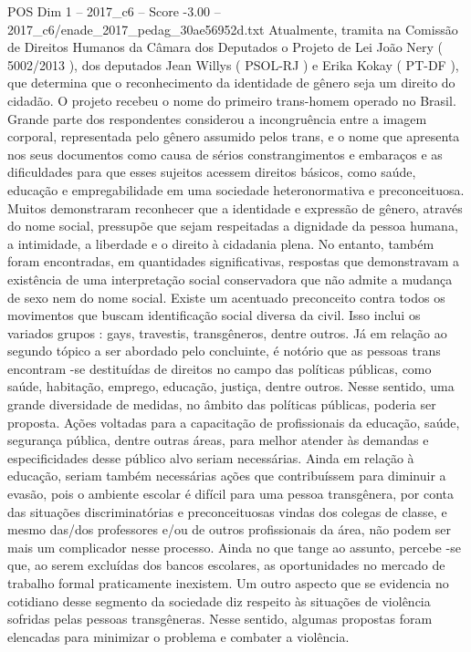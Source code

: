 \begin{textsample}{POS Dim 1 – 2017\_c6 – Score -3.00 – 2017\_c6/enade\_2017\_pedag\_30ae56952d.txt}
Atualmente, tramita na Comissão de Direitos Humanos da Câmara dos Deputados o Projeto de Lei João Nery ( 5002/2013 ), dos deputados Jean Willys ( PSOL-RJ ) e Erika Kokay ( PT-DF ), que determina que o reconhecimento da identidade de gênero seja um direito do cidadão.
O projeto recebeu o nome do primeiro trans-homem operado no Brasil.
Grande parte dos respondentes considerou a incongruência entre a imagem corporal, representada pelo gênero assumido pelos trans, e o nome que apresenta nos seus documentos como causa de sérios constrangimentos e embaraços e as dificuldades para que esses sujeitos acessem direitos básicos, como saúde, educação e empregabilidade em uma sociedade heteronormativa e preconceituosa.
Muitos demonstraram reconhecer que a identidade e expressão de gênero, através do nome social, pressupõe que sejam respeitadas a dignidade da pessoa humana, a intimidade, a liberdade e o direito à cidadania plena.
No entanto, também foram encontradas, em quantidades significativas, respostas que demonstravam a existência de uma interpretação social conservadora que não admite a mudança de sexo nem do nome social.
Existe um acentuado preconceito contra todos os movimentos que buscam identificação social diversa da civil.
Isso inclui os variados grupos : gays, travestis, transgêneros, dentre outros.
Já em relação ao segundo tópico a ser abordado pelo concluinte, é notório que as pessoas trans encontram -se destituídas de direitos no campo das políticas públicas, como saúde, habitação, emprego, educação, justiça, dentre outros.
Nesse sentido, uma grande diversidade de medidas, no âmbito das políticas públicas, poderia ser proposta.
Ações voltadas para a capacitação de profissionais da educação, saúde, segurança pública, dentre outras áreas, para melhor atender às demandas e especificidades desse público alvo seriam necessárias.
Ainda em relação à educação, seriam também necessárias ações que contribuíssem para diminuir a evasão, pois o ambiente escolar é difícil para uma pessoa transgênera, por conta das situações discriminatórias e preconceituosas vindas dos colegas de classe, e mesmo das/dos professores e/ou de outros profissionais da área, não podem ser mais um complicador nesse processo.
Ainda no que tange ao assunto, percebe -se que, ao serem excluídas dos bancos escolares, as oportunidades no mercado de trabalho formal praticamente inexistem.
Um outro aspecto que se evidencia no cotidiano desse segmento da sociedade diz respeito às situações de violência sofridas pelas pessoas transgêneras.
Nesse sentido, algumas propostas foram elencadas para minimizar o problema e combater a violência.

\end{textsample}
